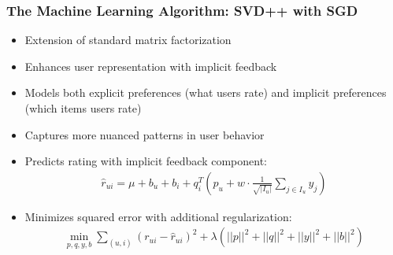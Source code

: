 \documentclass{beamer}
\begin{document}
\begin{frame}
\frametitle{The Machine Learning Algorithm: SVD++ with SGD}
\begin{itemize}
    \item Extension of standard matrix factorization
    \item Enhances user representation with implicit feedback
    \item Models both explicit preferences (what users rate) and implicit preferences (which items users rate)
    \item Captures more nuanced patterns in user behavior

    \item Predicts rating with implicit feedback component:
    \begin{align*}
    \hat{r}_{ui} = \mu + b_u + b_i + q_i^T \left(p_u + w \cdot \frac{1}{\sqrt{|I_u|}} \sum_{j \in I_u} y_j\right)
    \end{align*}
    \item Minimizes squared error with additional regularization:
    \begin{align*}
    \min_{p,q,y,b} \sum_{(u,i)} (r_{ui} - \hat{r}_{ui})^2 + \lambda(||p||^2 + ||q||^2 + ||y||^2 + ||b||^2)
    \end{align*}
\end{itemize}
\end{frame}
\end{document}
